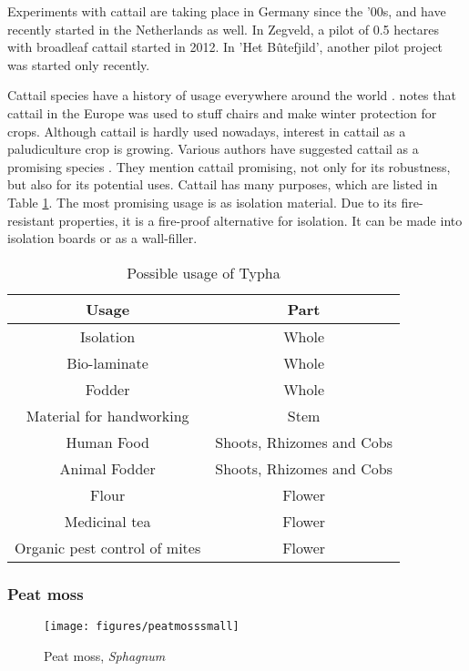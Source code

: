 \documentclass[a4paper,12pt]{scrbook}
\begin{document}
Experiments with cattail are taking place in Germany since the '00s, and have recently started in the Netherlands as well. In Zegveld, a pilot of 0.5 hectares with broadleaf cattail started in 2012. In 'Het B\^utefjild', another pilot project was started only recently. 

Cattail species have a history of usage everywhere around the world \citep{morton1975cattails}. \citet{morton1975cattails} notes that cattail in the Europe was used to stuff chairs and make winter protection for crops. Although cattail is hardly used nowadays, interest in cattail as a paludiculture crop is growing. Various authors have suggested cattail as a promising species \citep{morton1975cattails, heinz2011population}. They mention cattail promising, not only for its robustness, but also for its potential uses. Cattail has many purposes, which are listed in Table \ref{tab:typha}. The most promising usage is as isolation material. Due to its fire-resistant properties, it is a fire-proof alternative for isolation. It can be made into isolation boards or as a wall-filler. 


\begin{table}
\centering
\caption{Possible usage of Typha}
\begin{tabular}{|c|c|}
\hline 
\textbf{Usage} & \textbf{Part} \\ 
\hline 
Isolation & Whole \\ 
\hline 
Bio-laminate & Whole \\ 
\hline 
Fodder & Whole \\ 
\hline 
Material for handworking & Stem \\ 
\hline 
Human Food & Shoots, Rhizomes and Cobs \\ 
\hline 
Animal Fodder & Shoots, Rhizomes and Cobs \\ 
\hline 
Flour & Flower \\ 
\hline 
Medicinal tea & Flower \\ 
\hline 
Organic pest control of mites & Flower \\ 
\hline 
\end{tabular} 
\label{tab:typha}
\end{table}

\subsubsection{Peat moss}

\begin{figure}
    \centering
    \texttt{[image: figures/peatmosssmall]} 
    \caption{Peat moss, \textit{Sphagnum}}
    \label{fig:peatmoss}
\end{figure}
\end{document}
